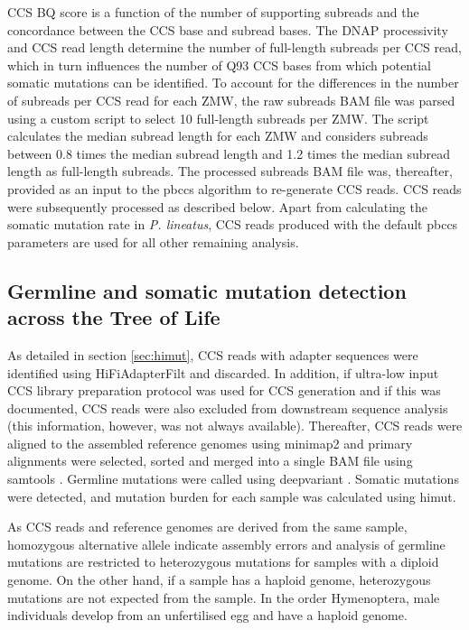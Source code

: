 CCS BQ score is a function of the number of supporting subreads and the concordance between the CCS base and subread bases. The DNAP processivity and CCS read length determine the number of full-length subreads per CCS read, which in turn influences the number of Q93 CCS bases from which potential somatic mutations can be identified. To account for the differences in the number of subreads per CCS read for each ZMW, the raw subreads BAM file was parsed using a custom script to select 10 full-length subreads per ZMW. The script calculates the median subread length for each ZMW and considers subreads between 0.8 times the median subread length and 1.2 times the median subread length as full-length subreads. The processed subreads BAM file was, thereafter, provided as an input to the pbccs algorithm to re-generate CCS reads. CCS reads were subsequently processed as described below. Apart from calculating the somatic mutation rate in \textit{P. lineatus}, CCS reads produced with the default pbccs parameters are used for all other remaining analysis.

\subsection{Germline and somatic mutation detection across the Tree of Life}

As detailed in section \ref{sec:himut}, CCS reads with adapter sequences were identified using HiFiAdapterFilt \cite{Sim2022-pi} and discarded. In addition, if ultra-low input CCS library preparation protocol was used for CCS generation and if this was documented, CCS reads were also excluded from downstream sequence analysis (this information, however, was not always available). Thereafter, CCS reads were aligned to the assembled reference genomes using minimap2 \cite{Li2018-am} and primary alignments were selected, sorted and merged into a single BAM file using samtools \cite{Li2011-ag}. Germline mutations were called using deepvariant \cite{Poplin2018-ub}. Somatic mutations were detected, and mutation burden for each sample was calculated using himut. 

As CCS reads and reference genomes are derived from the same sample, homozygous alternative allele indicate assembly errors and analysis of germline mutations are restricted to heterozygous mutations for samples with a diploid genome. On the other hand, if a sample has a haploid genome, heterozygous mutations are not expected from the sample. In the order Hymenoptera, male individuals develop from an unfertilised egg and have a haploid genome. 

